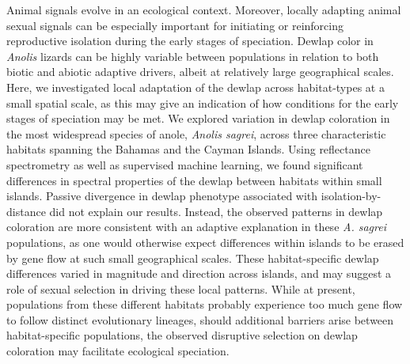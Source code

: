 Animal signals evolve in an ecological context. Moreover, locally adapting animal sexual signals can be especially important for initiating or reinforcing reproductive isolation during the early stages of speciation. Dewlap color in \textit{Anolis} lizards can be highly variable between populations in relation to both biotic and abiotic adaptive drivers, albeit at relatively large geographical scales. Here, we investigated local adaptation of the dewlap across habitat-types at a small spatial scale, as this may give an indication of how conditions for the early stages of speciation may be met. We explored variation in dewlap coloration in the most widespread species of anole, \textit{Anolis sagrei}, across three characteristic habitats spanning the Bahamas and the Cayman Islands. Using reflectance spectrometry as well as supervised machine learning, we found significant differences in spectral properties of the dewlap between habitats within small islands. Passive divergence in dewlap phenotype associated with isolation-by-distance did not explain our results. Instead, the observed patterns in dewlap coloration are more consistent with an adaptive explanation in these \textit{A. sagrei} populations, as one would otherwise expect differences within islands to be erased by gene flow at such small geographical scales. These habitat-specific dewlap differences varied in magnitude and direction across islands, and may suggest a role of sexual selection in driving these local patterns. While at present, populations from these different habitats probably experience too much gene flow to follow distinct evolutionary lineages, should additional barriers arise between habitat-specific populations, the observed disruptive selection on dewlap coloration may facilitate ecological speciation.